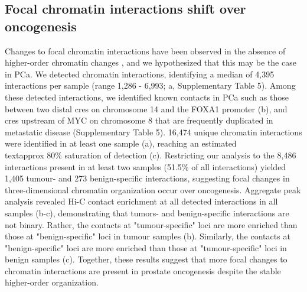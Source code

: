 \subsection{Focal chromatin interactions shift over oncogenesis}

Changes to focal chromatin interactions have been observed in the absence of higher-order chromatin changes \cite{takayamaTransitionQuiescentActivated2021,johnstoneLargeScaleTopologicalChanges2020}, and we hypothesized that this may be the case in PCa.
We detected chromatin interactions, identifying a median of 4,395 interactions per sample (range 1,286 - 6,993; a, Supplementary Table 5).
Among these detected interactions, we identified known contacts in PCa such as those between two distal \glspl{cre} on chromosome 14 and the FOXA1 promoter \cite{zhouNoncodingMutationsTarget2020} (b), and \glspl{cre} upstream of MYC on chromosome 8 that are frequently duplicated in metastatic disease \cite{quigleyGenomicHallmarksStructural2018} (Supplementary Table 5).
16,474 unique chromatin interactions were identified in at least one sample (a), reaching an estimated \\textapprox 80\% saturation of detection (c).
Restricting our analysis to the 8,486 interactions present in at least two samples (51.5\% of all interactions) yielded 1,405 tumour- and 273 benign-specific interactions, suggesting focal changes in three-dimensional chromatin organization occur over oncogenesis.
Aggregate peak analysis revealed Hi-C contact enrichment at all detected interactions in all samples (b-c), demonstrating that tumors- and benign-specific interactions are not binary.
Rather, the contacts at "tumour-specific" loci are more enriched than those at "benign-specific" loci in tumour samples (b).
Similarly, the contacts at "benign-specific" loci are more enriched than those at "tumour-specific" loci in benign samples (c).
Together, these results suggest that more focal changes to chromatin interactions are present in prostate oncogenesis despite the stable higher-order organization.


